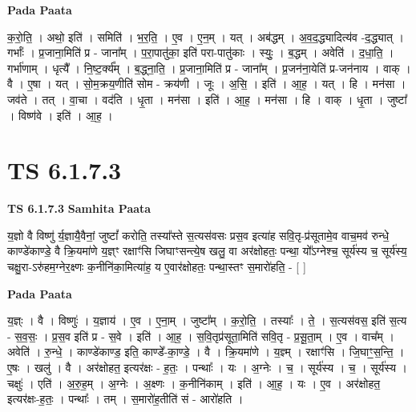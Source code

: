 \documentclass[17pt]{extarticle}
\begin{document}
\textbf{Pada Paata} \newline

क॒रो॒ति॒ । अथो॒ इति॑ । समिति॑ । भ॒र॒ति॒ । ए॒व । ए॒न॒म् । यत् । अब॑द्धम् । अ॒व॒द॒द्ध्यादित्य॑व -द॒द्ध्यात् । गर्भाः᳚ । प्र॒जाना॒मिति॑ प्र - जाना᳚म् । प॒रा॒पातु॑का॒ इति॑ परा-पातु॑काः । स्युः॒ । ब॒द्धम् । अवेति॑ । द॒धा॒ति॒ । गर्भा॑णाम् । धृत्यै᳚ । नि॒ष्ट॒र्क्य᳚म् । ब॒द्ध्ना॒ति॒ । प्र॒जाना॒मिति॑ प्र - जाना᳚म् । प्र॒जन॑ना॒येति॑ प्र-जन॑नाय । वाक् । वै । ए॒षा । यत् । सो॒म॒क्रय॒णीति॑ सोम - क्रय॑णी । जूः । अ॒सि॒ । इति॑ । आ॒ह॒ । यत् । हि । मन॑सा । जव॑ते । तत् । वा॒चा । वद॑ति । धृ॒ता । मन॑सा । इति॑ । आ॒ह॒ । मन॑सा । हि । वाक् । धृ॒ता । जुष्टा᳚ । विष्ण॑वे । इति॑ । आ॒ह॒ ।  \newline





\section{ TS 6.1.7.3 }

\textbf{TS 6.1.7.3 } \newline
\textbf{Samhita Paata} \newline

य॒ज्ञो वै विष्णु॑ र्य॒ज्ञायै॒वैनां॒ जुष्टां᳚ करोति॒ तस्या᳚स्ते स॒त्यस॑वसः प्रस॒व इत्या॑ह सवि॒तृ-प्र॑सूतामे॒व वाच॒मव॑ रुन्धे॒ काण्डे॑काण्डे॒ वै क्रि॒यमा॑णे य॒ज्ञ्ꣳ रक्षाꣳ॑सि जिघाꣳसन्त्ये॒ष खलु॒ वा अर॑क्षोहतः॒ पन्था॒ यो᳚ऽग्नेश्च॒ सूर्य॑स्य च॒ सूर्य॑स्य॒ चक्षु॒रा-ऽरु॑हम॒ग्नेर॒क्ष्णः क॒नीनि॑का॒मित्या॑ह॒ य ए॒वार॑क्षोहतः॒ पन्था॒स्तꣳ स॒मारो॑हति॒ - [  ] \newline

\textbf{Pada Paata} \newline

य॒ज्ञ्ः । वै । विष्णुः॑ । य॒ज्ञाय॑ । ए॒व । ए॒ना॒म् । जुष्टा᳚म् । क॒रो॒ति॒ । तस्याः᳚ । ते॒ । स॒त्यस॑वस॒ इति॑ स॒त्य - स॒व॒सः॒ । प्र॒स॒व इति॑ प्र - स॒वे । इति॑ । आ॒ह॒ । स॒वि॒तृप्र॑सूता॒मिति॑ सवि॒तृ - प्र॒सू॒ता॒म् । ए॒व । वाच᳚म् । अवेति॑ । रु॒न्धे॒ । काण्डे॑काण्ड॒ इति॒ काण्डे᳚-का॒ण्डे॒ । वै । क्रि॒यमा॑णे । य॒ज्ञ्म् । रक्षाꣳ॑सि । जि॒घाꣳ॒॒स॒न्ति॒ । ए॒षः । खलु॑ । वै । अर॑क्षोहत॒ इत्यर॑क्षः - ह॒तः॒ । पन्थाः᳚ । यः । अ॒ग्नेः । च॒ । सूर्य॑स्य । च॒ । सूर्य॑स्य । चक्षुः॑ । एति॑ । अ॒रु॒ह॒म् । अ॒ग्नेः । अ॒क्ष्णः । क॒नीनि॑काम् । इति॑ । आ॒ह॒ । यः । ए॒व । अर॑क्षोहत॒ इत्यर॑क्षः-ह॒तः॒ । पन्थाः᳚ । तम् । स॒मारो॑ह॒तीति॑ सं - आरो॑हति ।  \newline
\end{document}
